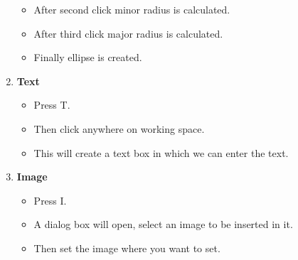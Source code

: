 \begin{enumerate}
\begin{itemize}
\item After second click minor radius is calculated.
\item After third click major radius is calculated.
\item Finally ellipse is created.
\end{itemize}
\item \textbf{Text}
\begin{itemize}
\item Press T.
\item Then click anywhere on working space.
\item This will create a text box in which we can enter the text.
\end{itemize}
\item \textbf{Image}
\begin{itemize}
\item Press I.
\item A dialog box will open, select an image to be inserted in it.
\item Then set the image where you want to set.
\end{itemize}
\end{enumerate}